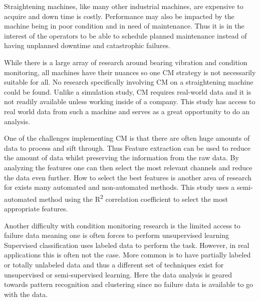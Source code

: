 \documentclass[]{article}
\begin{document}
Straightening machines, like many other industrial machines, are expensive to acquire and down time is costly. Performance may also be impacted by the machine being in poor condition and in need of maintenance. Thus it is in the interest of the operators to be able to schedule planned maintenance instead of having unplanned downtime and catastrophic failures.

While there is a large array of research around bearing vibration and condition monitoring, all machines have their nuances so one CM strategy is not necessarily suitable for all. No research specifically involving CM on a straightening machine could be found. Unlike a simulation study, CM requires real-world data and it is not readily available unless working inside of a company. This study has access to real world data from such a machine and serves as a great opportunity to do an analysis.

One of the challenges implementing CM is that there are often huge amounts of data to process and sift through. Thus Feature extraction can be used to reduce the amount of data whilst preserving the information from the raw data. By analyzing the features one can then select the most relevant channels and reduce the data even further. How to select the best features is another area of research for exists many automated and non-automated methods. This study uses a semi-automated method using the R\textsuperscript{2} correlation coefficient to select the most appropriate features.

Another difficulty with condition monitoring research is the limited access to failure data meaning one is often forces to perform unsupervised learning
Supervised classification uses labeled data to perform the task. However, in real applications this is often not the case. More common is to have partially labeled or totally unlabeled data and thus a different set of techniques exist for unsupervised or semi-supervised learning. Here the data analysis is geared towards pattern recognition and clustering since no failure data is available to go with the data.
\end{document}
